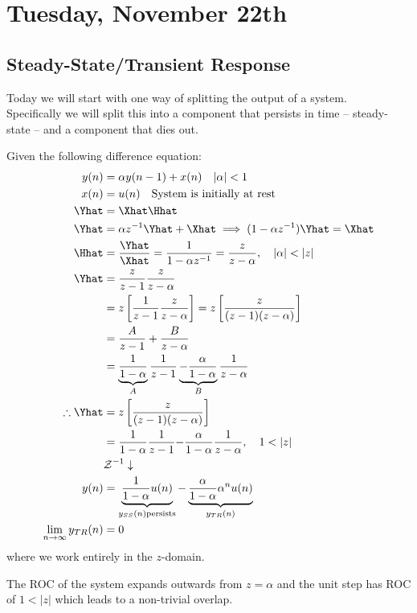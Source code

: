 \section{Tuesday, November 22th}
\subsection{Steady-State/Transient Response}
Today we will start with one way of splitting the output of a system.\\
Specifically we will split this into a component that persists in time -- steady-state -- and a component that dies out.

Given the following difference equation:
\begin{align*}
    y(n)
    &= \alpha y(n-1) + x(n)\quad|\alpha|<1
    \\
    x(n) &= u(n)\quad\text{System is initially at rest}
    \\
    \Yhat 
    &= \Xhat\Hhat
    \\
    \Yhat 
    &=\alpha z^{-1} \Yhat + \Xhat\implies(1-\alpha z^{-1})\Yhat=\Xhat
    \\
    \Hhat
    &=\frac{\Yhat}{\Xhat}=\frac{1}{1-\alpha z^{-1}}=\frac{z}{z-\alpha},\quad|\alpha|<|z|
    \\
    \Yhat
    &=\frac{z}{z-1}\frac{z}{z-\alpha}
    \\
    &=z\left[\frac{1}{z-1}\frac{z}{z-\alpha}\right]
    =z\left[\frac{z}{(z-1)(z-\alpha)}\right]
    \\
    &= \frac{A}{z-1}+\frac{B}{z-\alpha}
    \\
    &= \underbrace{\frac{1}{1-\alpha}}_{A}\frac{1}{z-1}\underbrace{-\frac{\alpha}{1-\alpha}}_B\frac{1}{z-\alpha}
    \\
    \therefore\Yhat 
    &=z\left[\frac{z}{(z-1)(z-\alpha)}\right]
    \\
    &= {\frac{1}{1-\alpha}}\frac{1}{z-1}{-\frac{\alpha}{1-\alpha}}\frac{1}{z-\alpha},\quad1<|z|
    \\
    &\mathcal Z^{-1}\downarrow
    \\
    y(n)
    &=\underbrace{\frac{1}{1-\alpha}u(n)}_{y_{SS}(n) \text{persists}} - \underbrace{\frac{\alpha}{1-\alpha}\alpha^n u(n)}_{y_{TR}(n)}
    \\
    \lim_{n\to\infty} y_{TR}(n) &= 0
\end{align*}
where we work entirely in the $z$-domain.

The ROC of the system expands outwards from $z=\alpha$ and the unit step has ROC of $1<|z|$ which leads to a non-trivial overlap.

